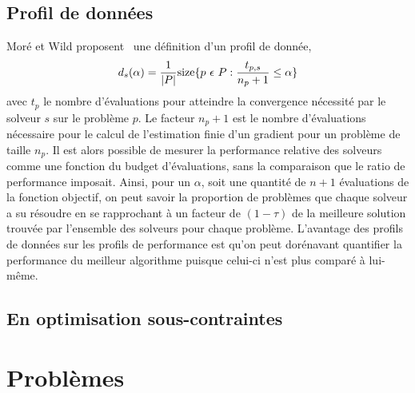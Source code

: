 	\subsection{Profil de données}
	Moré et Wild proposent~\cite{MoWi2009} une définition d'un profil de donnée, 
	\begin{equation*}
	d_s(\alpha)=\frac{1}{|P|}\text{size}\{p\ \epsilon \ P : \frac{t_{p,s}}{n_p+1} \leq \alpha \}\\
	\end{equation*}
	avec $t_p$ le nombre d'évaluations pour atteindre la convergence nécessité par le solveur $s$ sur le problème $p$. Le facteur $n_p+1$ est le nombre d'évaluations nécessaire pour le calcul de l'estimation finie d'un gradient pour un problème de taille $n_p$. Il est alors possible de mesurer la performance relative des solveurs comme une fonction du budget d'évaluations, sans la comparaison que le ratio de performance imposait. Ainsi, pour un $\alpha$, soit une quantité de $n+1$ évaluations de la fonction objectif, on peut savoir la proportion de problèmes que chaque solveur a su résoudre en se rapprochant à un facteur de $(1-\tau)$ de la meilleure solution trouvée par l'ensemble des solveurs pour chaque problème. L'avantage des profils de données sur les profils de performance est qu'on peut dorénavant quantifier la performance du meilleur algorithme puisque celui-ci n'est plus comparé à lui-même.\\
	\subsection{En optimisation sous-contraintes}
\section{Problèmes}
